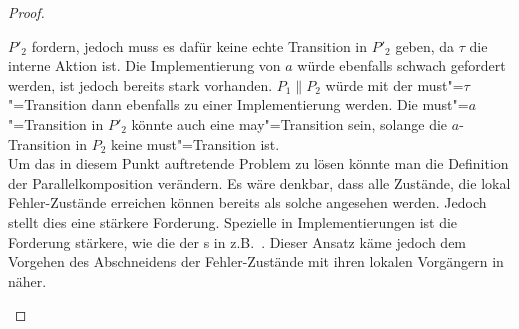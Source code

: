 \begin{proof}
\begin{enumerate}
      $P'_2$ fordern, jedoch muss es dafür keine echte Transition in $P'_2$
      geben, da $\tau$ die interne Aktion ist. Die Implementierung von $a$
      würde ebenfalls schwach gefordert werden, ist jedoch bereits stark
      vorhanden. $P_1\|P_2$ würde mit der must"=$\tau$"=Transition dann
      ebenfalls zu einer Implementierung werden. Die must"=$a$"=Transition in
      $P'_2$ könnte auch eine may"=Transition sein, solange die $a$-Transition
      in $P_2$ keine must"=Transition ist.\\
      Um das in diesem Punkt auftretende Problem zu lösen könnte man die
      Definition der Parallelkomposition verändern. Es wäre denkbar, dass alle
      Zustände, die lokal Fehler-Zustände erreichen können bereits als solche
      angesehen werden. Jedoch stellt dies eine stärkere Forderung. Spezielle
      in Implementierungen ist die Forderung stärkere, wie die der \EIO{}s in
      z.B.~\cite{Schinko2016BA}. Dieser Ansatz käme jedoch dem Vorgehen des
      Abschneidens der Fehler-Zustände mit ihren lokalen Vorgängern
      in~\cite{Vogler2016MIA3} näher.

    \begin{figure}[htbp]
      \begin{center}
\end{center}
\end{figure}
\end{enumerate}
\end{proof}
